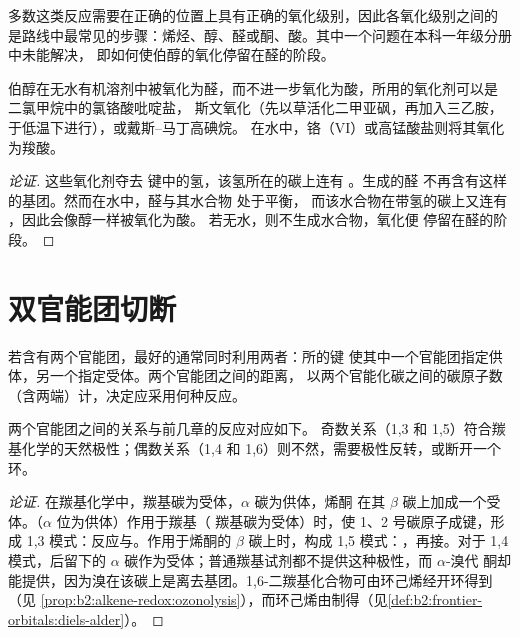 多数这类反应需要在正确的位置上具有正确的氧化级别，因此各氧化级别之间的
是路线中最常见的步骤：烯烃、醇、醛或酮、酸。其中一个问题在本科一年级分册中未能解决，
即如何使伯醇的氧化停留在醛的阶段。

\begin{proposition}[温和氧化]\label{prop:b2:retrosynthesis:mild-oxidation}
伯醇在无水有机溶剂中被氧化为醛，而不进一步氧化为酸，所用的氧化剂可以是
二氯甲烷中的氯铬酸吡啶盐，
斯文氧化（先以草活化二甲亚砜，再加入三乙胺，于低温下进行），或戴斯–马丁高碘烷。
在水中，铬（VI）或高锰酸盐则将其氧化为羧酸。
\end{proposition}

\begin{proof}[论证]
这些氧化剂夺去  键中的氢，该氢所在的碳上连有 。生成的醛
不再含有这样的基团。然而在水中，醛与其水合物  处于平衡，
而该水合物在带氢的碳上又连有 ，因此会像醇一样被氧化为酸。
若无水，则不生成水合物，氧化便
停留在醛的阶段。
\end{proof}

\section{双官能团切断}

若含有两个官能团，最好的通常同时利用两者：所的键
使其中一个官能团指定供体，另一个指定受体。两个官能团之间的距离，
以两个官能化碳之间的碳原子数（含两端）计，决定应采用何种反应。

\begin{proposition}[模式及其反应]\label{prop:b2:retrosynthesis:patterns}
两个官能团之间的关系与前几章的反应对应如下。
奇数关系（1,3 和 1,5）符合羰基化学的天然极性；偶数关系（1,4
和 1,6）则不然，需要极性反转，或断开一个环。
\end{proposition}


\begin{proof}[论证]
在羰基化学中，羰基碳为受体，$\alpha$ 碳为供体，烯酮
在其 $\beta$ 碳上加成一个受体。（$\alpha$ 位为供体）作用于羰基（
羰基碳为受体）时，使 1、2 号碳原子成键，形成 1,3 模式：反应与。作用于烯酮的 $\beta$
碳上时，构成 1,5 模式：，再接。对于 1,4 模式，后留下的
$\alpha$ 碳作为受体；普通羰基试剂都不提供这种极性，而 $\alpha$-溴代
酮却能提供，因为溴在该碳上是离去基团。1,6-二羰基化合物可由环己烯经开环得到（见
\cref{prop:b2:alkene-redox:ozonolysis}），而环己烯由制得（见\cref{def:b2:frontier-orbitals:diels-alder}）。
\end{proof}

